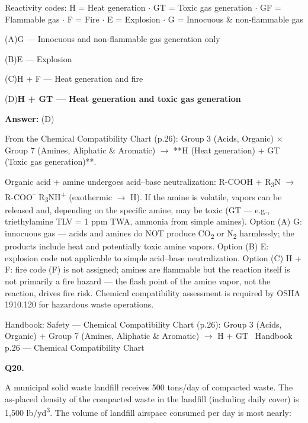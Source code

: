 \documentclass[11pt]{article}
\newcommand{\correct}[1]{\textbf{#1}\;{\color{accent}$\checkmark$}}
\newcommand{\optline}[2]{\par\noindent\hspace{1.2em}(#1)\hspace{0.6em}#2}
\begin{document}
Reactivity codes: H = Heat generation $\cdot$ GT = Toxic gas generation $\cdot$ GF = Flammable gas $\cdot$ F = Fire $\cdot$ E = Explosion $\cdot$ G = Innocuous \& non-flammable gas\par\vspace{3pt}
\optline{A}{G --- Innocuous and non-flammable gas generation only}
\optline{B}{E --- Explosion}
\optline{C}{H + F --- Heat generation and fire}
\optline{D}{\correct{H + GT --- Heat generation and toxic gas generation}}
\par\vspace{3pt}
\vspace{2pt}\par\noindent\colorbox{boxbg}{\parbox{\dimexpr\linewidth-2\fboxsep\relax}{%
\vspace{2pt}\textbf{Answer:} (D)\par\vspace{2pt}
{\small From the Chemical Compatibility Chart (p.26): Group 3 (Acids, Organic) $\times$ Group 7 (Amines, Aliphatic \& Aromatic) $\rightarrow$ **H (Heat generation) + GT (Toxic gas generation)**.

Organic acid + amine undergoes acid--base neutralization: R-COOH + R\textsubscript{3}N $\rightarrow$ R-COO\textsuperscript{--} R\textsubscript{3}NH\textsuperscript{+} (exothermic $\rightarrow$ H). If the amine is volatile, vapors can be released and, depending on the specific amine, may be toxic (GT --- e.g., triethylamine TLV = 1 ppm TWA, ammonia from simple amines). Option (A) G: innocuous gas --- acids and amines do NOT produce CO\textsubscript{2} or N\textsubscript{2} harmlessly; the products include heat and potentially toxic amine vapors. Option (B) E: explosion code not applicable to simple acid--base neutralization. Option (C) H + F: fire code (F) is not assigned; amines are flammable but the reaction itself is not primarily a fire hazard --- the flash point of the amine vapor, not the reaction, drives fire risk. Chemical compatibility assessment is required by OSHA 1910.120 for hazardous waste operations.}\par\vspace{2pt}
{\footnotesize\color{soft}Handbook: Safety --- Chemical Compatibility Chart (p.26): Group 3 (Acids, Organic) + Group 7 (Amines, Aliphatic \& Aromatic) $\rightarrow$ H + GT \textbullet\ Handbook p.26 --- Chemical Compatibility Chart}\vspace{2pt}
}}
\vspace{9pt}
\filbreak
\textbf{\color{accent}Q20.}\par\vspace{2pt}
A municipal solid waste landfill receives 500 tons/day of compacted waste. The as-placed density of the compacted waste in the landfill (including daily cover) is 1,500 lb/yd\textsuperscript{3}. The volume of landfill airspace consumed per day is most nearly:
\end{document}
